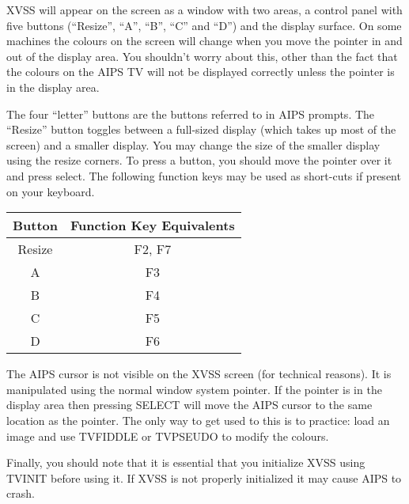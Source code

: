 XVSS will appear on the screen as a window with two areas, a control
panel with five buttons (``Resize'', ``A'', ``B'', ``C'' and ``D'')
and the display surface. On some machines the colours on the screen
will change when you move the pointer in and out of the display area.
You shouldn't worry about this, other than the fact that the colours
on the AIPS TV will not be displayed correctly unless the pointer is
in the display area.

The four ``letter'' buttons are the buttons referred to in AIPS
prompts. The ``Resize'' button toggles between a full-sized display
(which takes up most of the screen) and a smaller display. You may
change the size of the smaller display using the resize corners. To
press a button, you should move the pointer over it and press select.
The following function keys may be used as short-cuts if present on
your keyboard.

\vspace{16pt}

\begin{tabular}{|c|c|}
\hline
Button & Function Key Equivalents \\
\hline
Resize & F2, F7 \\
A & F3 \\
B & F4 \\
C & F5 \\
D & F6 \\
\hline
\end{tabular}

\vspace{16pt}

The AIPS cursor is not visible on the XVSS screen (for technical
reasons). It is manipulated using the normal window system pointer. If
the pointer is in the display area then pressing SELECT will move the
AIPS cursor to the same location as the pointer. The only way to get
used to this is to practice: load an image and use TVFIDDLE or
TVPSEUDO to modify the colours.

Finally, you should note that it is essential that you initialize XVSS
using TVINIT before using it. If XVSS is not properly initialized it
may cause AIPS to crash.

